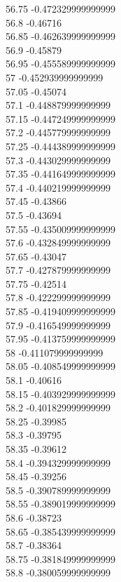 {56.75	-0.472329999999999\\
56.8	-0.46716\\
56.85	-0.462639999999999\\
56.9	-0.45879\\
56.95	-0.455589999999999\\
57	-0.452939999999999\\
57.05	-0.45074\\
57.1	-0.448879999999999\\
57.15	-0.447249999999999\\
57.2	-0.445779999999999\\
57.25	-0.444389999999999\\
57.3	-0.443029999999999\\
57.35	-0.441649999999999\\
57.4	-0.440219999999999\\
57.45	-0.43866\\
57.5	-0.43694\\
57.55	-0.435009999999999\\
57.6	-0.432849999999999\\
57.65	-0.43047\\
57.7	-0.427879999999999\\
57.75	-0.42514\\
57.8	-0.422299999999999\\
57.85	-0.419409999999999\\
57.9	-0.416549999999999\\
57.95	-0.413759999999999\\
58	-0.411079999999999\\
58.05	-0.408549999999999\\
58.1	-0.40616\\
58.15	-0.403929999999999\\
58.2	-0.401829999999999\\
58.25	-0.39985\\
58.3	-0.39795\\
58.35	-0.39612\\
58.4	-0.394329999999999\\
58.45	-0.39256\\
58.5	-0.390789999999999\\
58.55	-0.389019999999999\\
58.6	-0.38723\\
58.65	-0.385439999999999\\
58.7	-0.38364\\
58.75	-0.381849999999999\\
58.8	-0.380059999999999\\
}
